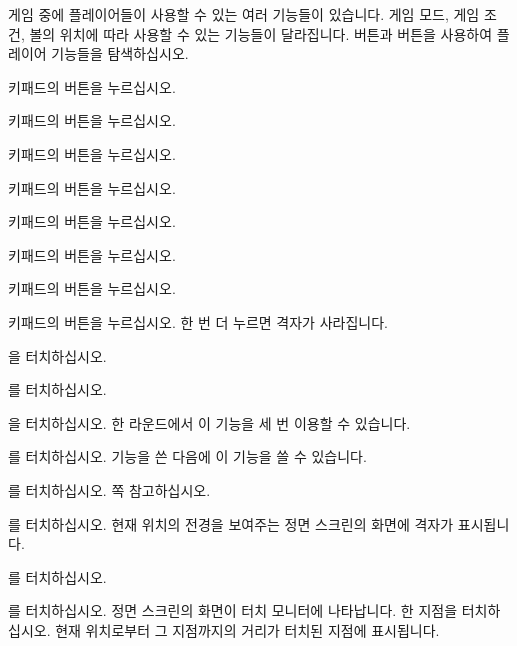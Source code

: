 \documentclass[10pt, openright, language=korean]{hzguide}
\begin{document}
게임 중에 플레이어들이 사용할 수 있는 여러 기능들이 있습니다.
게임 모드, 게임 조건, 볼의 위치에 따라 사용할 수 있는 기능들이 달라집니다.
 버튼과  버튼을 사용하여 플레이어 기능들을 탐색하십시오.


키패드의  버튼을 누르십시오.

키패드의  버튼을 누르십시오.

키패드의  버튼을 누르십시오.

키패드의  버튼을 누르십시오.

키패드의  버튼을 누르십시오.

키패드의  버튼을 누르십시오.

키패드의  버튼을 누르십시오.

키패드의  버튼을 누르십시오. 한 번 더 누르면 격자가 사라집니다.


을 터치하십시오.

를 터치하십시오.

을 터치하십시오. 한 라운드에서 이 기능을 세 번 이용할 수 있습니다.

를 터치하십시오.  기능을 쓴 다음에 이 기능을 쓸 수 있습니다.

를 터치하십시오. 
\pageref{sec:game_options} 쪽 \를 참고하십시오.

를 터치하십시오. 현재 위치의 전경을 보여주는 정면 스크린의 화면에 격자가 표시됩니다.

를 터치하십시오.

를 터치하십시오. 정면 스크린의 화면이 터치 모니터에 나타납니다. 한 지점을 터치하십시오. 현재 위치로부터 그 지점까지의 거리가 터치된 지점에 표시됩니다.
\end{document}
